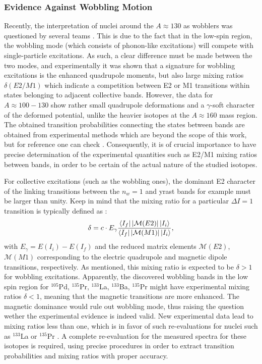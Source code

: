 \subsubsection*{Evidence Against Wobbling Motion}

Recently, the interpretation of nuclei around the $A \approx 130$ as wobblers was questioned by several teams \cite{nomura2021examining,nomura2022questioning,lv2022evidence,guo2020risk}. This is due to the fact that in the low-spin region, the wobbling mode (which consists of phonon-like excitations) will compete with single-particle excitations. As such, a clear difference must be made between the two modes, and experimentally it was shown that a signature for wobbling excitations is the enhanced quadrupole moments, but also large mixing ratios $\delta(E2/M1)$ which indicate a competition between E2 or M1 transitions within states belonging to adjacent collective bands. However, the data for $A\approx 100-130$ show rather small quadrupole deformations and a $\gamma$-soft character of the deformed potential, unlike the heavier isotopes at the $A \approx 160$ mass region. The obtained transition probabilities connecting the states between bands are obtained from experimental methods which are beyond the scope of this work, but for reference one can check \cite{lv2022evidence}. Consequently, it is of crucial importance to have precise determination of the experimental quantities such as E2/M1 mixing ratios between bands, in order to be certain of the actual nature of the studied isotopes.

For collective excitations (such as the wobbling ones), the dominant E2 character of the linking transitions between the $n_w=1$ and yrast bands for example must be larger than unity. Keep in mind that the mixing ratio for a particular $\Delta I=1$ transition is typically defined as \cite{krane1970determination,nomura2021examining}:
\begin{align}
    \delta=c\cdot E_\gamma\frac{\bra{I_f}|\mathcal{M}(E2)|\ket{I_i}}{\bra{I_f}|\mathcal{M}(M1)|\ket{I_i}}, 
\end{align}
with $E_\gamma=E(I_i)-E(I_f)$ and the reduced matrix elements $\mathcal{M}(E2)$, $\mathcal{M}(M1)$ corresponding to the electric quadrupole and magnetic dipole transitions, respectively. As mentioned, this mixing ratio is expected to be $\delta >1$ for wobbling excitations. Apparently, the discovered wobbling bands in the low spin region for $^{105}$Pd, $^{135}$Pr, $^{133}$La, $^{133}$Ba, $^{135}$Pr might have experimental mixing ratios $\delta<1$, meaning that the magnetic transitions are more enhanced. The magnetic dominance would rule out wobbling mode, thus raising the question wether the experimental evidence is indeed valid. New experimental data lead to mixing ratios less than one, which is in favor of such re-evaluations for nuclei such as $^{133}$La \cite{hua2020comment} or $^{135}$Pr \cite{guo2021comment,lv2022evidence}. A complete re-evaluation for the measured spectra for these isotopes is required, using precise procedures in order to extract transition probabilities and mixing ratios with proper accuracy.


